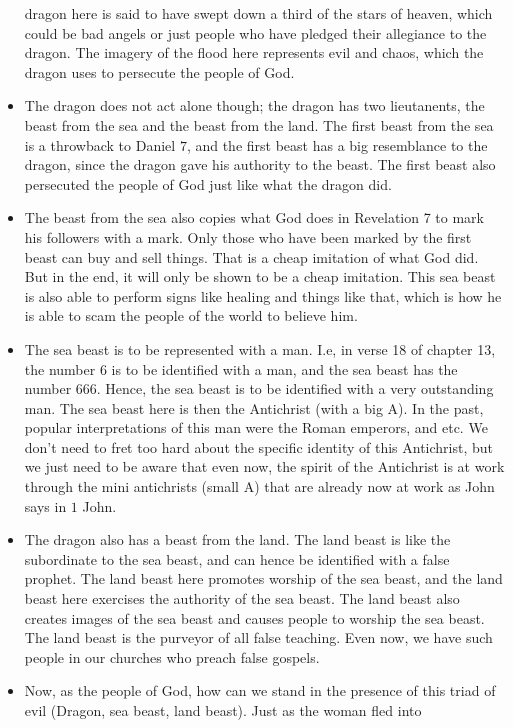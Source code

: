 \begin{itemize}
{  dragon here is said to have swept down a third of the stars of heaven,
  which could be bad angels or just people who have pledged their allegiance
  to the dragon.  The imagery of the flood here represents evil and chaos,
  which the dragon uses to persecute the people of God.  }
  \item{The dragon does not act alone though; the dragon has two lieutanents,
  the beast from the sea and the beast from the land.  The first beast from
  the sea is a throwback to Daniel $7$, and the first beast has a big
  resemblance to the dragon, since the dragon gave his authority to the
  beast.  The first beast also persecuted the people of God just like what
  the dragon did.}
  \item{The beast from the sea also copies what God does in Revelation 7 to
  mark his followers with a mark.  Only those who have been marked by the
  first beast can buy and sell things.  That is a cheap imitation of what God
  did.  But in the end, it will only be shown to be a cheap imitation.  This
  sea beast is also able to perform signs like healing and things like that,
  which is how he is able to scam the people of the world to believe him.  }
  \item{The sea beast is to be represented with a man.  I.e, in verse 18 of
  chapter 13, the number $6$ is to be identified with a man, and the sea
  beast has the number $666$.  Hence, the sea beast is to be identified with
  a very outstanding man.  The sea beast here is then the Antichrist (with a
  big A).  In the past, popular interpretations of this man were the Roman
  emperors, and etc.  We don't need to fret too hard about the specific
  identity of this Antichrist, but we just need to be aware that even now,
  the spirit of the Antichrist is at work through the mini antichrists (small
  A) that are already now at work as John says in $1$ John.  }
  \item{The dragon also has a beast from the land.  The land beast is like
  the subordinate to the sea beast, and can hence be identified with a false
  prophet.  The land beast here promotes worship of the sea beast, and the
  land beast here exercises the authority of the sea beast.  The land beast
  also creates images of the sea beast and causes people to worship the sea
  beast. The land beast is the purveyor of all false teaching. Even now, we have such people in our churches who preach false gospels.}
  \item{Now, as the people of God, how can we stand in the presence of this
  triad of evil (Dragon, sea beast, land beast).  Just as the woman fled into
}
\end{itemize}
